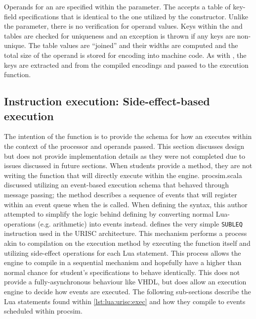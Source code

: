 Operands for an  are specified within the  parameter. The  accepts a table of key-field specifications that is identical to the one utilized by the  constructor. Unlike the  parameter, there is no verification for operand values. Keys within the  and  tables are checked for uniqueness and an exception is thrown if any keys are non-unique. The table values are ``joined'' and their widths are computed and the total size of the operand is stored for encoding into machine code. As with , the keys are extracted and from the compiled encodings and passed to the execution function. 

\subsection{Instruction execution: Side-effect-based execution}
\label{sec:lua:sec:instructions:sec:exec}

The intention of the  function is to provide the schema for how an  executes within the context of the processor and operands passed. This section discusses design but does not provide implementation details as they were not completed due to issues discussed in future sections. When students provide a  method, they are not writing the function that will directly execute within the engine. procsim.scala discussed utilizing an event-based execution schema that behaved through message passing; the  method describes a sequence of events that will register within an event queue when the  is called. When defining the syntax, this author attempted to simplify the logic behind defining  by converting normal Lua-operations (e.g. arithmetic) into events instead.  defines the very simple \texttt{SUBLEQ} instruction used in the URISC architecture. This mechanism performs a process akin to compilation on the execution method by executing the function itself and utilizing side-effect operations for each Lua statement. This process allows the engine to compile in a sequential mechanism and hopefully have a higher than normal chance for student's specifications to behave identically. This does not provide a fully-asynchronous behaviour like VHDL, but does allow an execution engine to decide how events are executed. The following sub-sections describe the Lua statements found within \cref{lst:lua:urisc:exec} and how they compile to events scheduled within procsim.  

